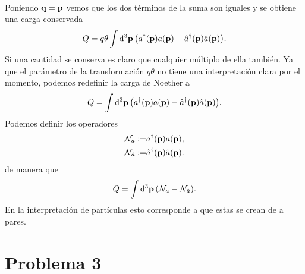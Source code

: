 \documentclass{article}
\begin{document}
\begin{enumerate}[(a)]
\begin{align}
\begin{split}
\end{split}
\end{align}
Poniendo $\vb{q}=\vb{p}$ vemos que los dos términos de la suma son iguales y se obtiene una carga conservada
\begin{equation}
Q=q\theta\int\dd[3]{\vb{p}}\qty(a^\dagger(\vb{p})a(\vb{p})-\hat{a}^\dagger(\vb{p})\hat{a}(\vb{p})).
\end{equation}
Si una cantidad se conserva es claro que cualquier múltiplo de ella también. Ya que el parámetro de la transformación $q\theta$ no tiene una interpretación clara por el momento, podemos redefinir la carga de Noether a 
\begin{equation}
Q=\int\dd[3]{\vb{p}}\qty(a^\dagger(\vb{p})a(\vb{p})-\hat{a}^\dagger(\vb{p})\hat{a}(\vb{p})).
\end{equation}
Podemos definir los operadores
\begin{align}
\begin{split}
\mathcal{N}_a:=&a^\dagger(\vb{p})a(\vb{p}),\\
\mathcal{N}_{\hat{a}}:=&\hat{a}^\dagger(\vb{p})\hat{a}(\vb{p}).
\end{split}
\end{align}
de manera que
\begin{equation}
Q=\int\dd[3]{\vb{p}}\qty(\mathcal{N}_a-\mathcal{N}_{\hat{a}}).
\end{equation}
En la interpretación de partículas esto corresponde a que estas se crean de a pares.

\end{enumerate}

\section*{Problema 3}
\end{document}
